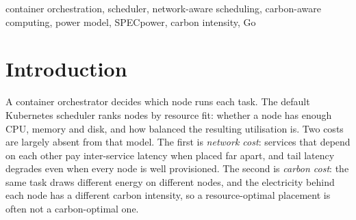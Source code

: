 \documentclass[conference]{IEEEtran}
\begin{document}
\maketitle

\begin{abstract}
Container orchestrators place workloads mainly by resource availability and treat network topology and carbon cost as secondary. We present Okube-Energy, a scheduler extension for Okube, a custom Go orchestrator, that scores every candidate node on network cost and carbon cost in one pipeline. Its novelty lies in four things: a composable pipeline in which the network and energy stages toggle independently, so the default, network-only, energy-only and fused schedulers are ablations of one code path; a task-class-aware carbon weight that is raised for time-flexible work and lowered for latency-critical work; a carbon cost on a fixed scale, which treats a zero-carbon grid as a valid value and does not inflate differences between uniformly clean grids; and an evaluation that computes CO$_2$ from power curves learned from \NSystemsKept{} SPECpower\_ssj2008 systems. On a seeded simulation of a three-zone cluster, with settings chosen on one set of seeds and reported on another, the fused scheduler at an energy weight of \HeadlineW{} cuts dynamic CO$_2$ by \FusedCO\% (95\% CI $\pm\FusedCOci$) against the default scheduler while keeping mean dependency latency \FusedLatCut\% below default (network-aware alone: \NetLatCut\%). Under a saturating workload the carbon gain shrinks to \FusedCOStress\%. The study is simulation-based and uses illustrative regional carbon intensities; its limits are stated in Section~\ref{sec:threats}.
\end{abstract}

\begin{IEEEkeywords}
container orchestration, scheduler, network-aware scheduling, carbon-aware computing, power model, SPECpower, carbon intensity, Go
\end{IEEEkeywords}

\section{Introduction}
A container orchestrator decides which node runs each task. The default Kubernetes scheduler ranks nodes by resource fit: whether a node has enough CPU, memory and disk, and how balanced the resulting utilisation is. Two costs are largely absent from that model. The first is \emph{network cost}: services that depend on each other pay inter-service latency when placed far apart, and tail latency degrades even when every node is well provisioned. The second is \emph{carbon cost}: the same task draws different energy on different nodes, and the electricity behind each node has a different carbon intensity, so a resource-optimal placement is often not a carbon-optimal one.
\end{document}
